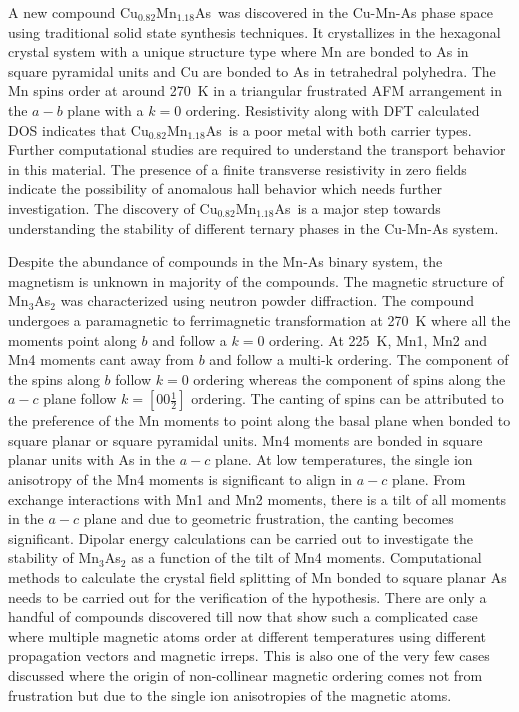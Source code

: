\documentclass[10pt,doublespacing,edeposit]{uiucthesis2020}
\newcommand*{\cumnas}{Cu$_{0.82}$Mn$_{1.18}$As}
\begin{document}
\begin{mainmatter}
A new compound \cumnas\ was discovered in the Cu-Mn-As phase space using traditional solid state synthesis techniques. It crystallizes in the hexagonal crystal system with a unique structure type where Mn are bonded to As in square pyramidal units and Cu are bonded to As in tetrahedral polyhedra. The Mn spins order at around 270~K in a triangular frustrated AFM arrangement in the $a-b$ plane with a $k=0$ ordering. Resistivity along with DFT calculated DOS indicates that \cumnas\ is a poor metal with both carrier types. Further computational studies are required to understand the transport behavior in this material. The presence of a finite transverse resistivity in zero fields indicate the possibility of anomalous hall behavior which needs further investigation. The discovery of \cumnas\ is a major step towards understanding the stability of different ternary phases in the Cu-Mn-As system.

Despite the abundance of compounds in the Mn-As binary system, the magnetism is unknown in majority of the compounds. The magnetic structure of Mn$_3$As$_2$ was characterized using neutron powder diffraction. The compound undergoes a paramagnetic to ferrimagnetic transformation at 270~K where all the moments point along $b$ and follow a $k=0$ ordering. At 225~K, Mn1, Mn2 and Mn4 moments cant away from $b$ and follow a multi-k ordering. The component of the spins along $b$ follow $k=0$ ordering whereas the component of spins along the $a-c$ plane follow $k=[00\frac{1}{2}]$ ordering. The canting of  spins can be attributed to the preference of the Mn moments to point along the basal plane when bonded to square planar or square pyramidal units. Mn4 moments are bonded in square planar units with As in the $a-c$ plane. At low temperatures, the single ion anisotropy of the Mn4 moments is significant to align in $a-c$ plane. From exchange interactions with Mn1 and Mn2 moments, there is a tilt of all moments in the $a-c$ plane and due to geometric frustration, the canting becomes significant. Dipolar energy calculations can be carried out to investigate the stability of Mn$_3$As$_2$ as a function of the tilt of Mn4 moments. Computational methods to calculate the crystal field splitting of Mn bonded to square planar As needs to be carried out for the verification of the hypothesis. There are only a handful of compounds discovered till now that show such a complicated case where multiple magnetic atoms order at different temperatures using different propagation vectors and magnetic irreps. This is also one of the very few cases discussed where the origin of non-collinear magnetic ordering comes not from frustration but due to the single ion anisotropies of the magnetic atoms.


\end{mainmatter}
\end{document}
